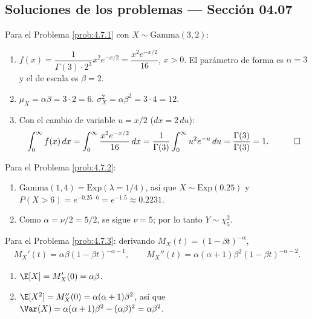 \subsection*{Soluciones de los problemas --- Sección 04.07}

\begin{solucion}
	\label{sol:4.7.1}
	Para el Problema \ref{prob:4.7.1} con $X \sim \text{Gamma}(3,2)$:
	\begin{enumerate}
		\item $f(x) = \dfrac{1}{\Gamma(3)\cdot 2^{3}}x^{2}e^{-x/2} = \dfrac{x^{2}e^{-x/2}}{16}$, $x>0$. El parámetro de forma es $\alpha=3$ y el de escala es $\beta=2$.
		\item $\mu_X = \alpha\beta = 3\cdot 2 = 6$. $\sigma_X^{2} = \alpha\beta^{2} = 3\cdot 4 = 12$.
		\item Con el cambio de variable $u=x/2$ ($dx=2\,du$):
		\begin{align*}
			\int_0^\infty f(x)\,dx = \int_0^\infty \frac{x^{2}e^{-x/2}}{16}\,dx = \frac{1}{\Gamma(3)}\int_0^\infty u^{2}e^{-u}\,du = \frac{\Gamma(3)}{\Gamma(3)} = 1. \quad \qedhere
		\end{align*}
	\end{enumerate}
\end{solucion}

\begin{solucion}
	\label{sol:4.7.2}
	Para el Problema \ref{prob:4.7.2}:
	\begin{enumerate}
		\item $\text{Gamma}(1,4) = \text{Exp}(\lambda=1/4)$, así que $X\sim\text{Exp}(0.25)$ y $P(X>6) = e^{-0.25\cdot 6} = e^{-1.5} \approx 0.2231$.
		\item Como $\alpha=\nu/2=5/2$, se sigue $\nu=5$; por lo tanto $Y \sim \chi^{2}_{5}$. \quad \qedhere
	\end{enumerate}
\end{solucion}

\begin{solucion}
	\label{sol:4.7.3}
	Para el Problema \ref{prob:4.7.3}: derivando $M_X(t)=(1-\beta t)^{-\alpha}$,
	\begin{align*}
		M_X'(t) = \alpha\beta(1-\beta t)^{-\alpha-1}, \qquad M_X''(t) = \alpha(\alpha+1)\beta^{2}(1-\beta t)^{-\alpha-2}.
	\end{align*}
	\begin{enumerate}
		\item $\E[X] = M_X'(0) = \alpha\beta$.
		\item $\E[X^{2}] = M_X''(0) = \alpha(\alpha+1)\beta^{2}$, así que $\Var(X) = \alpha(\alpha+1)\beta^{2} - (\alpha\beta)^{2} = \alpha\beta^{2}$. \quad \qedhere
	\end{enumerate}
\end{solucion}

